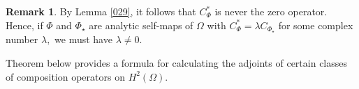 \documentclass[11pt]{amsart}%
\theoremstyle{definition}
\newtheorem{rem}[thm]{Remark}
\theoremstyle{remark}
\numberwithin{equation}{section}
\begin{document}








\begin{rem}
\label{083} By Lemma \ref{029}, it follows that $C_{\Phi}^{*}$ is never the
zero operator. Hence, if $\Phi$ and $\Phi_{\star}$ are analytic self-maps of
$\Omega$ with $C_{\Phi}^{*}=\lambda C_{\Phi_{\star}}$ for some complex number
$\lambda,$ we must have $\lambda\neq0.$
\end{rem}

Theorem below provides a formula for calculating the adjoints of certain
classes of composition operators on $H^{2}(\Omega).$
\end{document}
